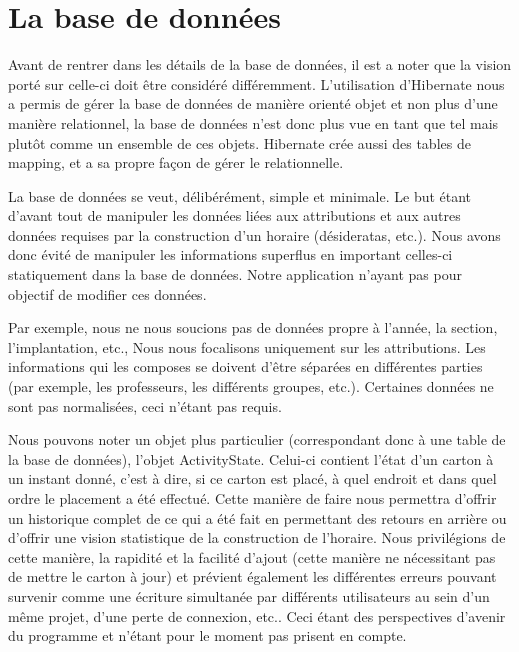 \chapter{La base de données}

Avant de rentrer dans les détails de la base de données, il est a noter que la vision porté sur celle-ci doit être considéré différemment. L'utilisation d'Hibernate nous a permis de gérer la base de données de manière orienté objet et non plus d'une manière relationnel, la base de données n'est donc plus vue en tant que tel mais plutôt comme un ensemble de ces objets. Hibernate crée aussi des tables de mapping, et a sa propre façon de gérer le relationnelle.

La base de données se veut, délibérément, simple et minimale. Le but étant d'avant tout de manipuler les données liées aux attributions et aux autres données requises par la construction d'un horaire (désideratas, etc.). Nous avons donc évité de manipuler les informations superflus en important celles-ci statiquement dans la base de données. Notre application n'ayant pas pour objectif de modifier ces données.

Par exemple, nous ne nous soucions pas de données propre à l'année, la section, l'implantation, etc.,  Nous nous focalisons uniquement sur les attributions. Les informations qui les composes se doivent d'être séparées en différentes parties (par exemple, les professeurs, les différents groupes, etc.). Certaines données ne sont pas normalisées, ceci n'étant pas requis.

Nous pouvons noter un objet plus particulier (correspondant donc à une table de la base de données), l'objet ActivityState. Celui-ci contient l'état d'un carton à un instant donné, c'est à dire, si ce carton est placé, à quel endroit et dans quel ordre le placement a été effectué.  Cette manière de faire nous permettra d'offrir un historique complet de ce qui a été fait en permettant des retours en arrière ou d'offrir une vision statistique de la construction de l'horaire. Nous privilégions de cette manière,  la rapidité et la facilité d'ajout (cette manière ne nécessitant pas de mettre le carton à jour) et prévient également les différentes erreurs pouvant survenir comme une écriture simultanée par différents utilisateurs au sein d'un même projet, d'une perte de connexion, etc.. Ceci étant des perspectives d'avenir du programme et n'étant pour le moment pas prisent en compte.


